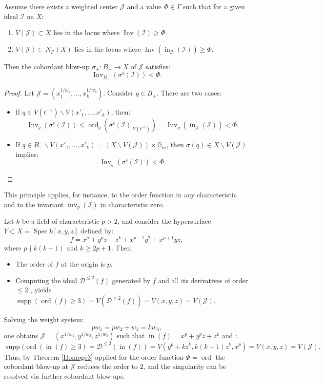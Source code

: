 \documentclass{amsart}
\renewcommand{\cD}{{\mathcal D}}
\newcommand{\cI}{{\mathcal I}}
\newcommand{\cJ}{{\mathcal J}}
\newcommand{\inn}{\operatorname{in}}
\newcommand{\Spec}{\operatorname{Spec}}
\renewcommand{\setminus}{\smallsetminus}
\newcommand{\ord}{{\operatorname{ord}}}
\newcommand{\inv}{{\operatorname{inv}}}
\newcommand{\Inv}{{\operatorname{Inv}}}
\def\supp{{\operatorname{supp}}}
\begin{document}
\begin{theorem} \label{Homoge3}
Assume there exists a weighted center $\cJ$ and a value $\Phi \in \Gamma$ such that for a given ideal $\cI$ on $X$:
\begin{enumerate}
  \item $V(\cJ) \subset X$ lies in the locus where $\Inv(\cI) \geq \Phi$.
  \item $V(\cJ) \subset N_{\cJ}(X)$ lies in the locus where $\Inv(\inn_{\cJ}(\cI)) \geq \Phi$.
\end{enumerate}
Then the cobordant blow-up $\sigma_+: B_+ \to X$ of $\cJ$ satisfies:
\[
\Inv_{B_+}(\sigma^s(\cI)) < \Phi.
\]
\end{theorem}

\begin{proof}
Let $\cJ = (x_1^{1/w_1}, \ldots, x_k^{1/w_k})$. Consider $q \in B_+$. There are two cases:
\begin{itemize}
  \item If $q \in V(t^{-1}) \setminus V(x'_1, \ldots, x'_k)$, then:
  \[
  \Inv_q(\sigma^s(\cI)) \leq \ord_q(\sigma^s(\cI)_{|V(t^{-1})}) = \Inv_q(\inn_\cJ(\cI)) < \Phi.
  \]
  \item If $q \in B_- \setminus V(x'_1, \ldots, x'_k) = (X \setminus V(\cJ)) \times \mathbb{G}_m$, then $\sigma(q) \in X \setminus V(\cJ)$ implies:
  \[
  \Inv_q(\sigma^s(\cI)) < \Phi.
  \]
\end{itemize}
\end{proof}

This principle applies, for instance, to the order function in any characteristic and to the invariant $\inv_p(\cI)$ in characteristic zero.

\begin{example}
Let $k$ be a field of characteristic $p > 2$, and consider the hypersurface $Y \subset X = \Spec k[x,y,z]$ defined by:
\[
f = x^p + y^p z + z^k + x^{p-1} y^2 + x^{p+1} y z,
\]
where $p \nmid k(k-1)$ and $k \geq 2p+1$. Then:
\begin{itemize}
  \item The order of $f$ at the origin is $p$.
  \item Computing the ideal $\cD^{\leq 2}(f)$  generated by $f$ and all its derivatives of order $\leq 2$ , yields $\supp(\ord(f)\geq3) =  V(\cD^{\leq 2}(f))=V(x,y,z)=V(\cJ)$.
\end{itemize}

Solving the weight system:
\[
p w_1 = p w_2 + w_3 = k w_3,
\]
one obtains $\cJ = (x^{1/w_1}, y^{1/w_3}, z^{1/w_3})$ such that $\inn(f) = x^p + y^p z + z^k$ and :
\[
 \supp(\ord(\inn(f)\geq 3) = \cD^{\leq 2}(\inn(f))=V(y^p+kz^k,k(k-1)z^k,x^p)=V(x,y,z)=V(\cJ).
\]
Thus, by Theorem \ref{Homoge3} applied for the order function $\Phi=\ord$ the cobordant blow-up at $\cJ$ reduces the order to $2$, and the singularity can be resolved via further cobordant blow-ups.

\end{example}
\end{document}
